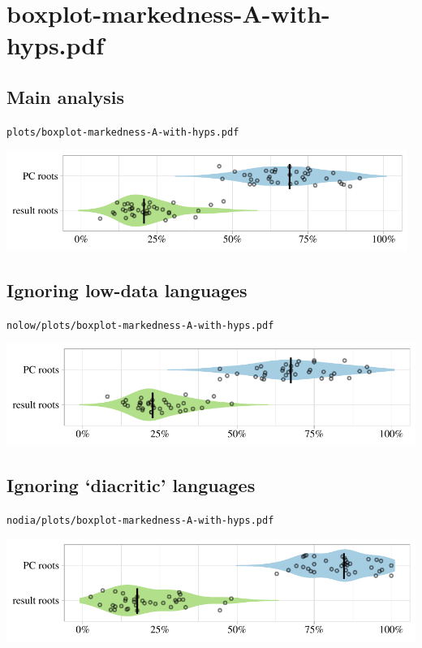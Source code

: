 \section{boxplot-markedness-A-with-hyps.pdf}

\subsection{Main analysis}

\texttt{plots/boxplot-markedness-A-with-hyps.pdf}

\includegraphics[width=0.98\textwidth]{../plots/boxplot-markedness-A-with-hyps.pdf}

\subsection{Ignoring low-data languages}

\texttt{nolow/plots/boxplot-markedness-A-with-hyps.pdf}

\includegraphics[width=1.0\textwidth]{../nolow/plots/boxplot-markedness-A-with-hyps.pdf}

\subsection{Ignoring `diacritic' languages}

\texttt{nodia/plots/boxplot-markedness-A-with-hyps.pdf}

\includegraphics[width=1.0\textwidth]{../nodia/plots/boxplot-markedness-A-with-hyps.pdf}

